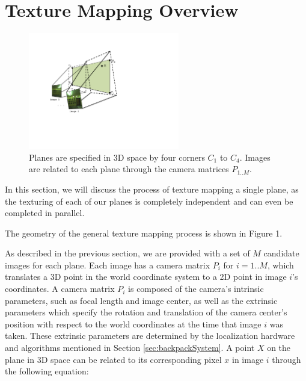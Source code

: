 \documentclass[10pt,twocolumn,letterpaper]{article}
\begin{document}
\section{Texture Mapping Overview}
\label{sec:textureMappingOverview}

\begin{figure}
  \centering
  \includegraphics[height=2in]{Projection.pdf}
  \caption{Planes are specified in 3D space by four corners $C_1$ to
    $C_4$. Images are related to each plane through the camera
    matrices $P_{1..M}$. }
  \label{fig:projection}
\end{figure}

In this section, we will discuss the process of texture mapping a
single plane, as the texturing of each of our planes is completely
independent and can even be completed in parallel.  

The geometry of the general texture mapping process is shown in Figure 1. 

 As
described in the previous section, we are provided with a set of $M$
candidate images for each plane. Each image has a camera matrix $P_i$ for $i=1..M$, which
translates a 3D point in the world coordinate system to a 2D point in
image $i$'s coordinates. A camera matrix $P_i$ is composed of the
camera's intrinsic parameters, such as focal length and image center,
as well as the extrinsic parameters which specify the rotation and
translation of the camera center's position with respect to the world
coordinates at the time that image $i$ was taken. These extrinsic
parameters are determined by the localization hardware and algorithms
mentioned in Section \ref{sec:backpackSystem}. A point $X$ on the
plane in 3D space can be related to its corresponding pixel $x$ in image $i$
through the following equation:
\end{document}
